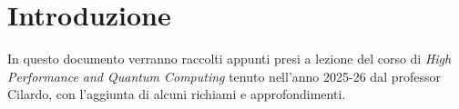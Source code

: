 \chapter*{Introduzione}
In questo documento verranno raccolti appunti presi a lezione del corso di \textit{High Performance and Quantum Computing} tenuto nell'anno 2025-26 dal professor Cilardo, con l'aggiunta di alcuni richiami e approfondimenti. 
